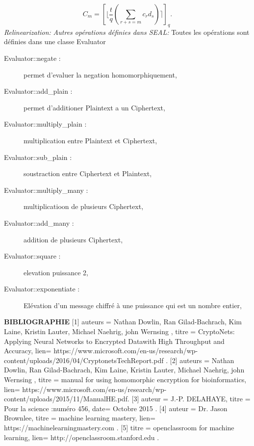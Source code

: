 \documentclass[a4paper,11pt]{report}
\begin{document}
$$C_m = [\lfloor\dfrac{t}{q}(\sum_{r+s=m}^{}c_rd_s)\rceil]_q.$$
\textit{Relinearization:}\newline
\newline
\textit{Autres opérations définies dans SEAL:}\newline
Toutes les opérations sont définies dans une classe Evaluator\newline
\begin{description}
 \item[Evaluator::negate :] permet d'evaluer la negation homomorphiquement,
 \item[Evaluator::add\_plain :] permet d'additioner Plaintext a un Ciphertext,
 \item[Evaluator::multiply\_plain :] multiplication entre Plaintext et Ciphertext,
 \item[Evaluator::sub\_plain :] soustraction entre Ciphertext et Plaintext,
 \item[Evaluator::multiply\_many :] multiplicatioon de plusieurs Ciphertext,
 \item[Evaluator::add\_many :] addition de plusieurs Ciphertext,
 \item[Evaluator::square :] elevation puissance 2,
 \item[Evaluator::exponentiate :] Elévation d'un message chiffré à une puissance qui est un nombre entier,
  \end{description}

\newpage
\textbf{BIBLIOGRAPHIE}\newline
\newline 
\scriptsize
[1]{
auteurs = {Nathan Dowlin, Ran Gilad-Bachrach, Kim Laine, Kristin Lauter, Michael Naehrig, john Wernsing  },
titre = {CryptoNets: Applying Neural Networks to Encrypted Datawith High Throughput and Accuracy},
lien= {https://www.microsoft.com/en-us/research/wp-content/uploads/2016/04/CryptonetsTechReport.pdf .}}
\newline
\newline
{[2]{
auteurs = {Nathan Dowlin, Ran Gilad-Bachrach, Kim Laine, Kristin Lauter, Michael Naehrig, john Wernsing  },
titre = {manual for using homomorphic encryption for bioinformatics},
lien= {https://www.microsoft.com/en-us/research/wp-content/uploads/2015/11/ManualHE.pdf.}}}
\newline
\newline
{[3]{
auteur = {J.-P. DELAHAYE},
titre = {Pour la science :numéro 456},
date= {Octobre 2015 .}}}
\newline
\newline
{[4]{
auteur = {Dr. Jason Brownlee},
titre = {machine learning mastery},
lien= {https://machinelearningmastery.com .}}}
\newline
\newline
{[5]{
titre = {openclassroom for machine learning},
lien= {http://openclassroom.stanford.edu .}}}
\newline
{}
\newline
\newline
\end{document}
